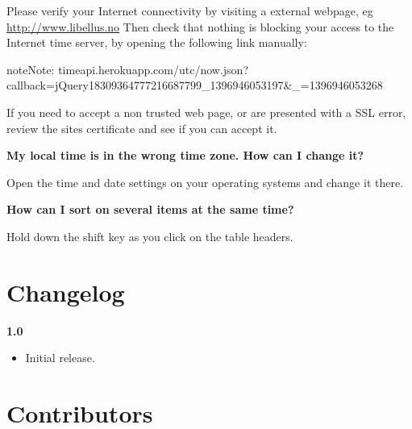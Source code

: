 \documentclass[letterpaper,10pt,english]{sphinxmanual}
\begin{document}
Please verify your Internet connectivity by visiting a external webpage, eg \href{http://www.libellus.no}{http://www.libellus.no}
Then check that nothing is blocking your access to the Internet time server, by opening the following link manually:

\begin{notice}{note}{Note:}
timeapi.herokuapp.com/utc/now.json?callback=jQuery18309364777216687799\_1396946053197\&\_=1396946053268
\end{notice}

If you need to accept a non trusted web page, or are presented with a SSL error, review the sites certificate and see if you can accept it.

\textbf{My local time is in the wrong time zone. How can I change it?}

Open the time and date settings on your operating systems and change it there.

\textbf{How can I sort on several items at the same time?}

Hold down the shift key as you click on the table headers.


\chapter{Changelog}
\label{Changelog::doc}\label{Changelog:changelog}
\textbf{1.0}
\begin{itemize}
\item {} 
Initial release.

\end{itemize}


\chapter{Contributors}
\label{Contributors::doc}\label{Contributors:contributors}
\end{document}
